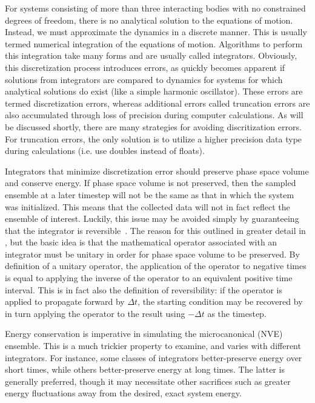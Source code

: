 \documentclass[9pt,bestpractices]{livecoms}
\begin{document}
For systems consisting of more than three interacting bodies with no constrained degrees of freedom, there is no analytical solution to the equations of motion.
Instead, we must approximate the dynamics in a discrete manner.
This is usually termed numerical integration of the equations of motion. 
Algorithms to perform this integration take many forms and are usually called integrators.
Obviously, this discretization process introduces errors, as quickly becomes apparent if solutions from integrators are compared to dynamics for systems for which analytical solutions do exist (like a simple harmonic oscillator).
These errors are termed discretization errors, whereas additional errors called truncation errors are also accumulated through loss of precision during computer calculations.
As will be discussed shortly, there are many strategies for avoiding discritization errors.
For truncation errors, the only solution is to utilize a higher precision data type during calculations (i.e. use doubles instead of floats).

Integrators that minimize discretization error should preserve phase space volume and conserve energy.
If phase space volume is not preserved, then the sampled ensemble at a later timestep will not be the same as that in which the system was initialized.
This means that the collected data will not in fact reflect the ensemble of interest.
Luckily, this issue may be avoided simply by guaranteeing that the integrator is reversible~\cite{Frenkel:2001:}.
The reason for this outlined in greater detail in , but the basic idea is that the mathematical operator associated with an integrator must be unitary in order for phase space volume to be preserved.
By definition of a unitary operator, the application of the operator to negative times is equal to applying the inverse of the operator to an equivalent positive time interval.
This is in fact also the definition of reversibility: if the operator is applied to propagate forward by $\Delta t$, the starting condition may be recovered by in turn applying the operator to the result using $- \Delta t$ as the timestep.

Energy conservation is imperative in simulating the microcanonical (NVE) ensemble.
This is a much trickier property to examine, and varies with different integrators.
For instance, some classes of integrators better-preserve energy over short times, while others better-preserve energy at long times.
The latter is generally preferred, though it may necessitate other sacrifices such as greater energy fluctuations away from the desired, exact system energy.
\end{document}
